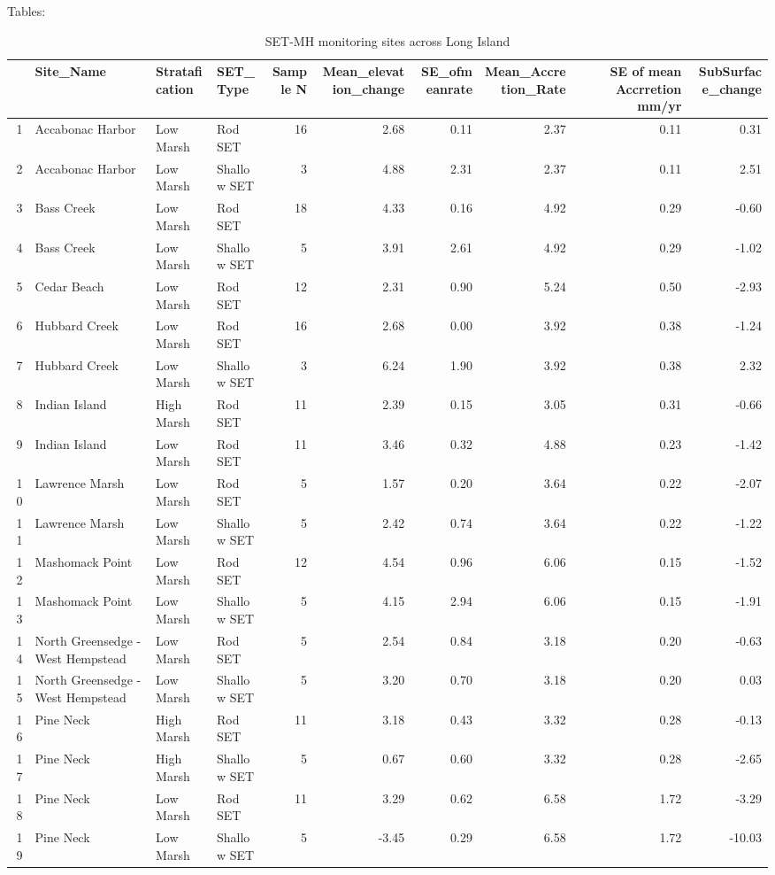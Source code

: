 \documentclass{article}\usepackage[]{graphicx}\usepackage[]{color}
\begin{document}
Tables:
\begin{table}[ht]
\centering
\begin{tabular}{rlllrrrrrr}
  \hline
 & Site\_Name & Stratafication & SET\_Type & Sample N & Mean\_elevation\_change & SE\_ofmeanrate & Mean\_Accretion\_Rate & SE of mean Accrretion mm/yr & SubSurface\_change \\ 
  \hline
1 & Accabonac Harbor & Low Marsh & Rod SET &  16 & 2.68 & 0.11 & 2.37 & 0.11 & 0.31 \\ 
  2 & Accabonac Harbor & Low Marsh & Shallow SET &   3 & 4.88 & 2.31 & 2.37 & 0.11 & 2.51 \\ 
  3 & Bass Creek & Low Marsh & Rod SET &  18 & 4.33 & 0.16 & 4.92 & 0.29 & -0.60 \\ 
  4 & Bass Creek & Low Marsh & Shallow SET &   5 & 3.91 & 2.61 & 4.92 & 0.29 & -1.02 \\ 
  5 & Cedar Beach & Low Marsh & Rod SET &  12 & 2.31 & 0.90 & 5.24 & 0.50 & -2.93 \\ 
  6 & Hubbard Creek & Low Marsh & Rod SET &  16 & 2.68 & 0.00 & 3.92 & 0.38 & -1.24 \\ 
  7 & Hubbard Creek & Low Marsh & Shallow SET &   3 & 6.24 & 1.90 & 3.92 & 0.38 & 2.32 \\ 
  8 & Indian Island & High Marsh & Rod SET &  11 & 2.39 & 0.15 & 3.05 & 0.31 & -0.66 \\ 
  9 & Indian Island & Low Marsh & Rod SET &  11 & 3.46 & 0.32 & 4.88 & 0.23 & -1.42 \\ 
  10 & Lawrence Marsh & Low Marsh & Rod SET &   5 & 1.57 & 0.20 & 3.64 & 0.22 & -2.07 \\ 
  11 & Lawrence Marsh & Low Marsh & Shallow SET &   5 & 2.42 & 0.74 & 3.64 & 0.22 & -1.22 \\ 
  12 & Mashomack Point & Low Marsh & Rod SET &  12 & 4.54 & 0.96 & 6.06 & 0.15 & -1.52 \\ 
  13 & Mashomack Point & Low Marsh & Shallow SET &   5 & 4.15 & 2.94 & 6.06 & 0.15 & -1.91 \\ 
  14 & North Greensedge - West Hempstead & Low Marsh & Rod SET &   5 & 2.54 & 0.84 & 3.18 & 0.20 & -0.63 \\ 
  15 & North Greensedge - West Hempstead & Low Marsh & Shallow SET &   5 & 3.20 & 0.70 & 3.18 & 0.20 & 0.03 \\ 
  16 & Pine Neck & High Marsh & Rod SET &  11 & 3.18 & 0.43 & 3.32 & 0.28 & -0.13 \\ 
  17 & Pine Neck & High Marsh & Shallow SET &   5 & 0.67 & 0.60 & 3.32 & 0.28 & -2.65 \\ 
  18 & Pine Neck & Low Marsh & Rod SET &  11 & 3.29 & 0.62 & 6.58 & 1.72 & -3.29 \\ 
  19 & Pine Neck & Low Marsh & Shallow SET &   5 & -3.45 & 0.29 & 6.58 & 1.72 & -10.03 \\ 
   \hline
\end{tabular}
\caption{SET-MH monitoring sites across Long Island} 
\end{table}
\end{document}
